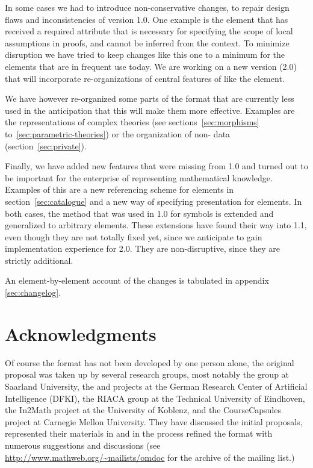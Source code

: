 In some cases we had to introduce non-conservative changes, to repair design flaws
and inconsistencies of version 1.0. One example is the {}
element that has received a required attribute
{} that is necessary for specifying the scope
of local assumptions in proofs, and cannot be inferred from the context. To
minimize disruption we have tried to keep changes like this one to a minimum for
the elements that are in frequent use today.  We are working on a new version
({\omdoc}2.0) that will incorporate re-organizations of central features of
{\omdoc} like the {} element.

We have however re-organized some parts of the {\omdoc} format that are currently
less used in the anticipation that this will make them more effective. Examples
are the representations of complex theories (see sections~\ref{sec:morphisms}
to~\ref{sec:parametric-theories}) or the organization of non-{\xml} data
(section~\ref{sec:private}).

Finally, we have added new features that were missing from {\omdoc}1.0 and turned out
to be important for the enterprise of representing mathematical knowledge.
Examples of this are a new referencing scheme for {\omdoc} elements in
section~\ref{sec:catalogue} and a new way of specifying presentation for {\omdoc}
elements. In both cases, the method that was used in {\omdoc}1.0 for symbols is
extended and generalized to arbitrary {\omdoc} elements. These extensions have
found their way into {\omdoc}1.1, even though they are not totally fixed yet,
since we anticipate to gain implementation experience for {\omdoc}2.0. They are
non-disruptive, since they are strictly additional.

An element-by-element account of the changes is tabulated in appendix
{\ref{sec:changelog}}.

\section*{Acknowledgments}
 
Of course the {\omdoc} format has not been developed by one person alone, the
original proposal was taken up by several research groups, most notably the
{\OMEGA} group at Saarland University, the {\inka} and {\activemath} projects at
the German Research Center of Artificial Intelligence (DFKI), the RIACA group at
the Technical University of Eindhoven, the {\sc In2Math} project at the University
of Koblenz, and the {\sc CourseCapsules} project at Carnegie Mellon University.
They have discussed the initial proposals, represented their materials in {\omdoc}
and in the process refined the format with numerous suggestions and discussions
(see {\url{http://www.mathweb.org/~mailists/omdoc}} for the archive of the
{\omdoc} mailing list.)

